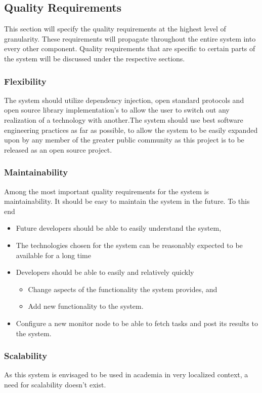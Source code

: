 \subsection{Quality Requirements}
\label{sec:overallQualityRequirement}
This section will specify the quality requirements at the highest level of
granularity. These requirements will propagate throughout the entire system
into every other component. Quality requirements that are specific to certain 
parts of the system will be discussed under the respective sections.

\subsubsection*{Flexibility}
The system should utilize dependency injection, open standard protocols and
open source library implementation's to allow the user to switch out any
realization of a technology with another.The system should use best software 
engineering practices as far as possible, to allow the system to be easily 
expanded upon by any member of the greater public community as this project is to
be released as an open source project.

\subsubsection*{Maintainability}
Among the most important quality requirements for the system is
maintainability. It should be easy to maintain the system in the future. To this end
\begin{itemize}
	\item Future developers should be able to easily understand the system,
	\item The technologies chosen for the system can be reasonably expected to be available for a long time
	\item Developers should be able to easily and relatively quickly
	\begin{itemize}
		\item Change aspects of the functionality the system provides, and
		\item Add new functionality to the system.
	\end{itemize}
  \item Configure a new monitor node to be able to fetch tasks and post its
    results to the system.
\end{itemize}

\subsubsection*{Scalability}
As this system is envisaged to be used in academia in very localized context,
a need for scalability doesn't exist.

